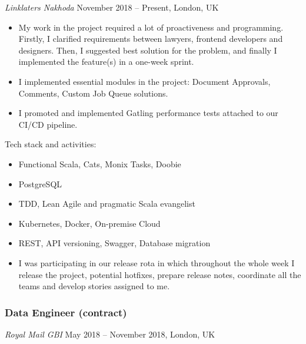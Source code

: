 \documentclass[]{rss}
\providecommand{\tightlist}{%
  \setlength{\itemsep}{0pt}\setlength{\parskip}{0pt}}
\begin{document}
\begin{resume}
\emph{Linklaters \textbar{} Nakhoda} November 2018 -- Present, London,
UK

\begin{itemize}
\item
  My work in the project required a lot of proactiveness and
  programming. Firstly, I clarified requirements between lawyers,
  frontend developers and designers. Then, I suggested best solution for
  the problem, and finally I implemented the feature(s) in a one-week
  sprint.
\item
  I implemented essential modules in the project: Document Approvals,
  Comments, Custom Job Queue solutions.
\item
  I promoted and implemented Gatling performance tests attached to our
  CI/CD pipeline.
\end{itemize}

Tech stack and activities:

\begin{itemize}
\tightlist
\item
  Functional Scala, Cats, Monix Tasks, Doobie
\item
  PostgreSQL
\item
  TDD, Lean Agile and pragmatic Scala evangelist
\item
  Kubernetes, Docker, On-premise Cloud
\item
  REST, API versioning, Swagger, Database migration
\item
  I was participating in our release rota in which throughout the whole
  week I release the project, potential hotfixes, prepare release notes,
  coordinate all the teams and develop stories assigned to me.
\end{itemize}

\subsubsection{Data Engineer (contract)}\label{data-engineer-contract}

\emph{Royal Mail \textbar{} GBI} May 2018 -- November 2018, London, UK


\end{resume}
\end{document}
